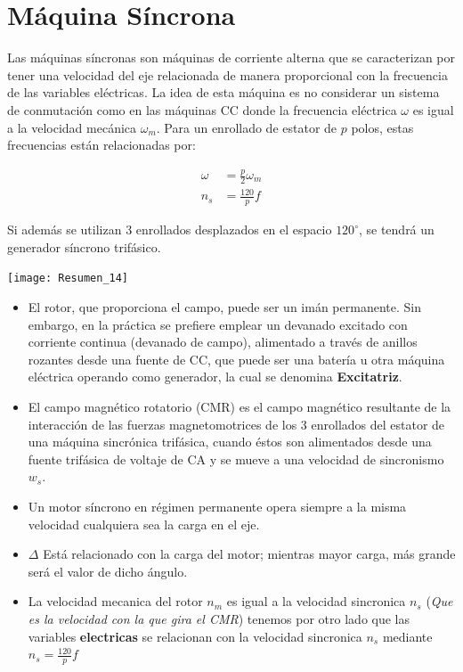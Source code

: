 \documentclass[
  11pt,
  letterpaper,
   addpoints,
   answers
  ]{exam}
\begin{document}
\section*{Máquina Síncrona}

\begin{minipage}{0.6\textwidth} %
    Las máquinas síncronas son máquinas de corriente alterna que se caracterizan por tener una velocidad del eje relacionada de manera proporcional con la frecuencia de las variables eléctricas. La idea de esta máquina es no considerar un sistema de conmutación como en las máquinas CC donde la frecuencia eléctrica $\omega$ es igual a la velocidad mecánica $\omega_{m}$. Para un enrollado de estator de \( p \) polos, estas frecuencias están relacionadas por:
    
    \begin{align}
        \omega &= \frac{p}{2}\omega_{m}\\
        n_{s} &= \frac{120}{p}f
    \end{align}
    
    Si además se utilizan 3 enrollados desplazados en el espacio \(120^{\circ}\), se tendrá un generador síncrono trifásico.
\end{minipage}%
\hfill
\begin{minipage}{0.35\textwidth} %
    \centering
    \texttt{[image: Resumen\_14]} %
\end{minipage}

\vspace{0.5cm} %

\begin{itemize}
  \item El rotor, que proporciona el campo, puede ser un imán permanente. Sin embargo, en la práctica se prefiere emplear un devanado excitado con corriente continua (devanado de campo), alimentado a través de anillos rozantes desde una fuente de CC, que puede ser una batería u otra máquina eléctrica operando como generador, la cual se denomina \textbf{Excitatriz}.
  \item El campo magnético rotatorio (CMR) es el campo magnético resultante de la interacción de las fuerzas magnetomotrices de los 3 enrollados del estator de una máquina sincrónica trifásica, cuando éstos son alimentados desde una fuente trifásica de voltaje de CA y se mueve a una velocidad de sincronismo $w_{s}$.
  \item Un motor síncrono en régimen permanente opera siempre a la misma velocidad cualquiera sea la carga en el eje.
  \item $\Delta$ Está relacionado con la carga del motor; mientras mayor carga, más grande será el valor de dicho ángulo.
  \item La velocidad mecanica del rotor $n_{m}$ es igual a la velocidad sincronica $n_{s}$ (\textit{Que es la velocidad con la que gira el CMR}) tenemos por otro lado que las variables \textbf{electricas} se relacionan con la velocidad sincronica $n_{s}$ mediante $n_{s} =\frac{120}{p}f$
\end{itemize}
\end{document}
